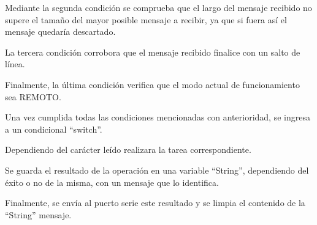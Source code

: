 \documentclass[a4paper, 12pt]{article}
\begin{document}
Mediante la segunda condición se comprueba que el largo del mensaje recibido no supere el tamaño del mayor posible mensaje a recibir, ya que si fuera así el mensaje quedaría descartado.

La tercera condición corrobora que el mensaje recibido finalice con un salto de línea.

Finalmente, la última condición verifica que el modo actual de funcionamiento sea REMOTO.

Una vez cumplida todas las condiciones mencionadas con anterioridad, se ingresa a un condicional ``switch''.

Dependiendo del carácter leído realizara la tarea correspondiente.

Se guarda el resultado de la operación en una variable ``String'', dependiendo del éxito o no de la misma, con un mensaje que lo identifica.

Finalmente, se envía al puerto serie este resultado y se limpia el contenido de la ``String'' mensaje.
\end{document}
